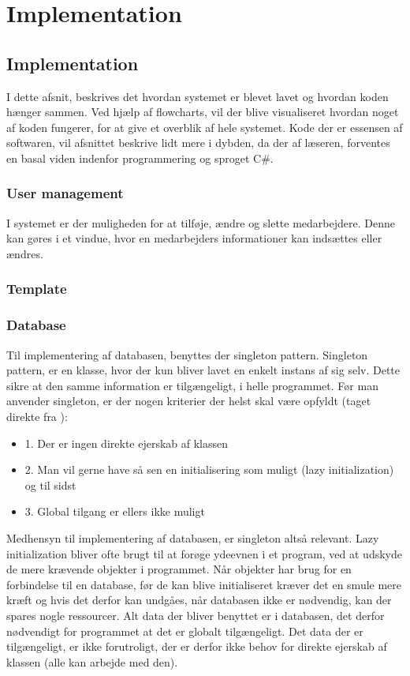 \chapter{Implementation}\label{ch:implem}

\section{Implementation}
I dette afsnit, beskrives det hvordan systemet er blevet lavet og hvordan koden hænger sammen. Ved hjælp af flowcharts, vil der blive visualiseret hvordan noget af koden fungerer, for at give et overblik af hele systemet. Kode der er essensen af softwaren, vil afsnittet beskrive lidt mere i dybden, da der af læseren, forventes en basal viden indenfor programmering og sproget C\#. 

\subsection{User management}
I systemet er der muligheden for at tilføje, ændre og slette medarbejdere. Denne kan gøres i et vindue, hvor en medarbejders informationer kan indsættes eller ændres.

\subsection{Template}

\subsection{Database}
Til implementering af databasen, benyttes der singleton pattern. Singleton pattern, er en klasse, hvor der kun bliver lavet en enkelt instans af sig selv. Dette sikre at den samme information er tilgængeligt, i helle programmet. \citep{SinPat, singleton} Før man anvender singleton, er der nogen kriterier der helst skal være opfyldt (taget direkte fra \citep{singleton}):

\begin{itemize}
\item 1. Der er ingen direkte ejerskab af klassen
\item 2. Man vil gerne have så sen en initialisering som muligt (lazy initialization) og til sidst
\item 3. Global tilgang er ellers ikke muligt
\end{itemize}

Medhensyn til implementering af databasen, er singleton altså relevant. Lazy initialization bliver ofte brugt til at forøge ydeevnen i et program, ved at udskyde de mere krævende objekter i programmet. Når objekter har brug for en forbindelse til en database, før de kan blive initialiseret kræver det en smule mere kræft og hvis det derfor kan undgåes, når databasen ikke er nødvendig, kan der spares nogle ressourcer. \citep{Lazy} Alt data der bliver benyttet er i databasen, det derfor nødvendigt for programmet at det er globalt tilgængeligt. Det data der er tilgængeligt, er ikke forutroligt, der er derfor ikke behov for direkte ejerskab af klassen (alle kan arbejde med den). 

